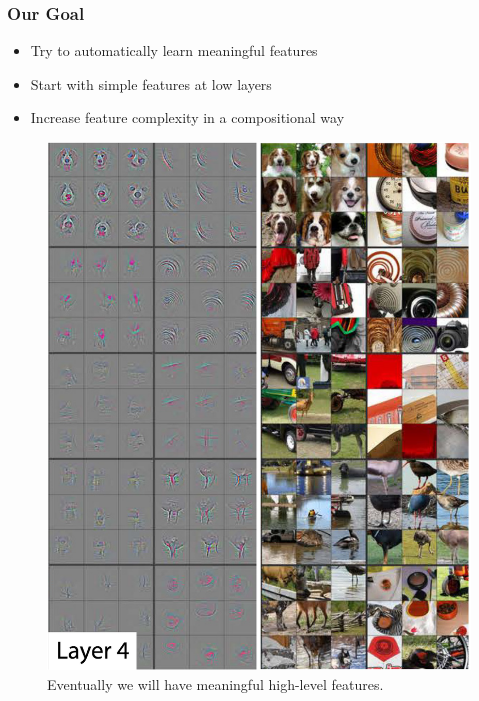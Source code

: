 \documentclass[10pt,mathserif]{beamer}
\begin{document}
\begin{frame}
  \frametitle{Our Goal}
  \begin{itemize}
  \item Try to automatically learn meaningful features
  \item Start with simple features at low layers
  \item Increase feature complexity in a compositional way
  \end{itemize}
  \begin{figure}[ht]
    \centering
    \includegraphics[width=0.3\paperwidth]{figure/zf_layer4}
    \caption{Eventually we will have meaningful high-level features.
      \label{fig:zf_layer4} }
  \end{figure}
\end{frame}
\end{document}
